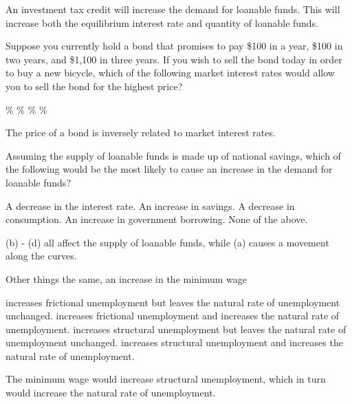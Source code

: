 \documentclass[addpoints,11pt]{exam}
\theoremstyle{definition}
\begin{document}
\begin{questions}
\begin{solution}
	An investment tax credit will increase the demand for loanable funds. This will increase both the equilibrium interest rate and quantity of loanable funds.
\end{solution}
	
	\question Suppose you currently hold a bond that promises to pay \$100 in a year, \$100 in two years, and \$1,100 in three years. If you wish to sell the bond today in order to buy a new bicycle, which of the following market interest rates would allow you to sell the bond for the highest price?
	
	\begin{choices}
		\%
		\%
		\%
		\%
	\end{choices}
	
\begin{solution}
	The price of a bond is inversely related to market interest rates.
\end{solution}

\question Assuming the supply of loanable funds is made up of national savings, which of the following would be the most likely to cause an increase in the demand for loanable funds?

\begin{choices}
	\choice A decrease in the interest rate.
	\choice An increase in savings.
	\choice A decrease in consumption.
	\choice An increase in government borrowing.
	\CorrectChoice None of the above.
\end{choices}

\begin{solution}
	(b) - (d) all affect the supply of loanable funds, while (a) causes a movement along the curves.
\end{solution}
	
	\question Other things the same, an increase in the minimum wage 
	
	\begin{choices}
		\choice increases frictional unemployment but leaves the natural rate of unemployment unchanged.
		\choice  increases frictional unemployment and increases the natural rate of unemployment.
		\choice  increases structural unemployment but leaves the natural rate of unemployment unchanged.
		\CorrectChoice increases structural unemployment and increases the natural rate of unemployment.
	\end{choices}
	
	\begin{solution}
		The minimum wage would increase structural unemployment, which in turn would increase the natural rate of unemployment.
	\end{solution}
	

\end{questions}
\end{document}
